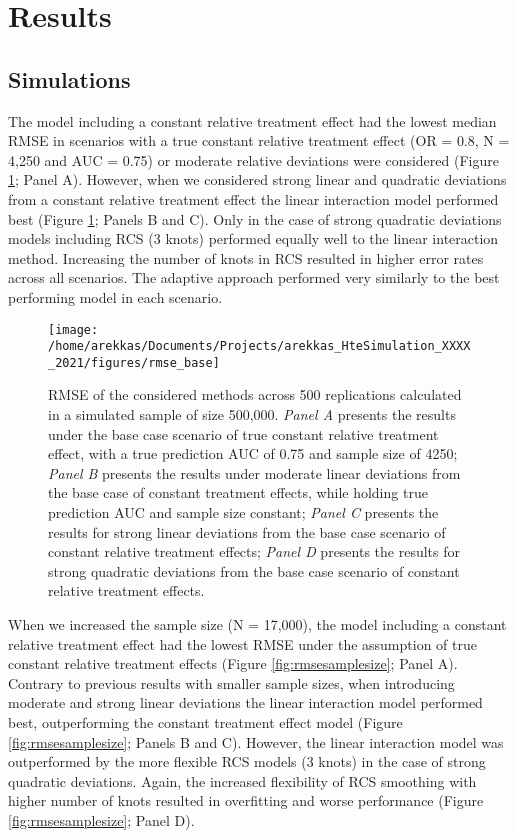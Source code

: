 \documentclass{article}
\begin{document}
\hypertarget{results}{%
\section{Results}\label{results}}

\hypertarget{simulations}{%
\subsection{Simulations}\label{simulations}}

The model including a constant relative treatment effect had the lowest
median RMSE in scenarios with a true constant relative treatment effect
(OR = 0.8, N = 4,250 and AUC = 0.75) or moderate relative deviations
were considered (Figure \ref{fig:rmsebase}; Panel A). However, when we
considered strong linear and quadratic deviations from a constant
relative treatment effect the linear interaction model performed best
(Figure \ref{fig:rmsebase}; Panels B and C). Only in the case of strong
quadratic deviations models including RCS (3 knots) performed equally
well to the linear interaction method. Increasing the number of knots in
RCS resulted in higher error rates across all scenarios. The adaptive
approach performed very similarly to the best performing model in each
scenario.

\begin{figure}
\texttt{[image: /home/arekkas/Documents/Projects/arekkas\_HteSimulation\_XXXX\_2021/figures/rmse\_base]} \caption{RMSE of the considered methods across 500 replications calculated in a simulated sample of size 500,000. \textit{Panel A} presents the results under the base case scenario of true constant relative treatment effect, with a true prediction AUC of 0.75 and sample size of 4250; \textit{Panel B} presents the results under moderate linear deviations from the base case of constant treatment effects, while holding true prediction AUC and sample size constant; \textit{Panel C} presents the results for strong linear deviations from the base case scenario of constant relative treatment effects; \textit{Panel D} presents the results for strong quadratic deviations from the base case scenario of constant relative treatment effects.}\label{fig:rmsebase}
\end{figure}

When we increased the sample size (N = 17,000), the model including a
constant relative treatment effect had the lowest RMSE under the
assumption of true constant relative treatment effects (Figure
\ref{fig:rmsesamplesize}; Panel A). Contrary to previous results with
smaller sample sizes, when introducing moderate and strong linear
deviations the linear interaction model performed best, outperforming
the constant treatment effect model (Figure \ref{fig:rmsesamplesize};
Panels B and C). However, the linear interaction model was outperformed
by the more flexible RCS models (3 knots) in the case of strong
quadratic deviations. Again, the increased flexibility of RCS smoothing
with higher number of knots resulted in overfitting and worse
performance (Figure \ref{fig:rmsesamplesize}; Panel D).
\end{document}
